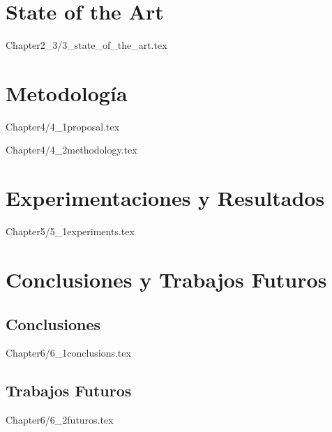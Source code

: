 \documentclass{report}
\begin{document}
\chapter{State of the Art}
{Chapter2_3/3_state_of_the_art.tex}


\chapter{Metodología}
{Chapter4/4_1proposal.tex}

{Chapter4/4_2methodology.tex}





\chapter{Experimentaciones y Resultados}
 {Chapter5/5_1experiments.tex}



\chapter{Conclusiones y Trabajos Futuros}

 \section{Conclusiones}
 {Chapter6/6_1conclusions.tex}

 \section{Trabajos Futuros}
 {Chapter6/6_2futuros.tex}
\end{document}
